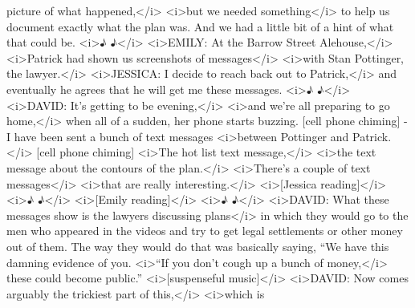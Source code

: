 \begin{itemize}
\begin{itemize}
    picture of what happened,\textless{}/i\textgreater{}
    \textless{}i\textgreater{}but we needed
    something\textless{}/i\textgreater{} to help us document exactly
    what the plan was. And we had a little bit of a hint of what that
    could be. \textless{}i\textgreater{}♪ ♪\textless{}/i\textgreater{}
    \textless{}i\textgreater{}EMILY: At the Barrow Street
    Alehouse,\textless{}/i\textgreater{}
    \textless{}i\textgreater{}Patrick had shown us screenshots of
    messages\textless{}/i\textgreater{} \textless{}i\textgreater{}with
    Stan Pottinger, the lawyer.\textless{}/i\textgreater{}
    \textless{}i\textgreater{}JESSICA: I decide to reach back out to
    Patrick,\textless{}/i\textgreater{} and eventually he agrees that he
    will get me these messages. \textless{}i\textgreater{}♪
    ♪\textless{}/i\textgreater{} \textless{}i\textgreater{}DAVID: It's
    getting to be evening,\textless{}/i\textgreater{}
    \textless{}i\textgreater{}and we're all preparing to go
    home,\textless{}/i\textgreater{} when all of a sudden, her phone
    starts buzzing. {[}cell phone chiming{]} - I have been sent a bunch
    of text messages \textless{}i\textgreater{}between Pottinger and
    Patrick.\textless{}/i\textgreater{} {[}cell phone chiming{]}
    \textless{}i\textgreater{}The hot list text
    message,\textless{}/i\textgreater{} \textless{}i\textgreater{}the
    text message about the contours of the
    plan.\textless{}/i\textgreater{} \textless{}i\textgreater{}There's a
    couple of text messages\textless{}/i\textgreater{}
    \textless{}i\textgreater{}that are really
    interesting.\textless{}/i\textgreater{}
    \textless{}i\textgreater{}{[}Jessica
    reading{]}\textless{}/i\textgreater{} \textless{}i\textgreater{}♪
    ♪\textless{}/i\textgreater{} \textless{}i\textgreater{}{[}Emily
    reading{]}\textless{}/i\textgreater{} \textless{}i\textgreater{}♪
    ♪\textless{}/i\textgreater{} \textless{}i\textgreater{}DAVID: What
    these messages show is the lawyers discussing
    plans\textless{}/i\textgreater{} in which they would go to the men
    who appeared in the videos and try to get legal settlements or other
    money out of them. The way they would do that was basically saying,
    ``We have this damning evidence of you.
    \textless{}i\textgreater{}``If you don't cough up a bunch of
    money,\textless{}/i\textgreater{} these could become public.''
    \textless{}i\textgreater{}{[}suspenseful
    music{]}\textless{}/i\textgreater{} \textless{}i\textgreater{}DAVID:
    Now comes arguably the trickiest part of
    this,\textless{}/i\textgreater{} \textless{}i\textgreater{}which is

\end{itemize}
\end{itemize}
